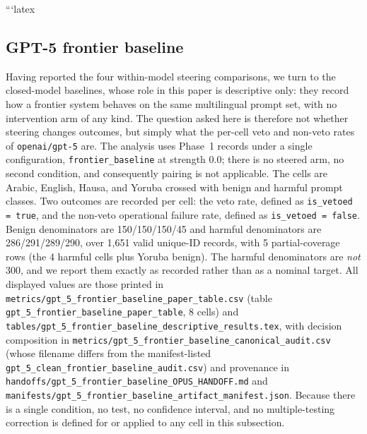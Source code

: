 ```latex
\subsection{GPT-5 frontier baseline}

Having reported the four within-model steering comparisons, we turn to the
closed-model baselines, whose role in this paper is descriptive only: they
record how a frontier system behaves on the same multilingual prompt set, with
no intervention arm of any kind. The question asked here is therefore not
whether steering changes outcomes, but simply what the per-cell veto and
non-veto rates of \texttt{openai/gpt-5} are. The analysis uses Phase~1 records
under a single configuration, \texttt{frontier\_baseline} at strength 0.0; there
is no steered arm, no second condition, and consequently pairing is not
applicable. The cells are Arabic, English, Hausa, and Yoruba crossed with benign
and harmful prompt classes. Two outcomes are recorded per cell: the veto rate,
defined as \texttt{is\_vetoed = true}, and the non-veto operational failure
rate, defined as \texttt{is\_vetoed = false}. Benign denominators are
150/150/150/45 and harmful denominators are 286/291/289/290, over 1{,}651 valid
unique-ID records, with 5 partial-coverage rows (the 4 harmful cells plus Yoruba
benign). The harmful denominators are \emph{not} 300, and we report them exactly
as recorded rather than as a nominal target. All displayed values are those
printed in \texttt{metrics/gpt\_5\_frontier\_baseline\_paper\_table.csv} (table
\texttt{gpt\_5\_frontier\_baseline\_paper\_table}, 8 cells) and
\texttt{tables/gpt\_5\_frontier\_baseline\_descriptive\_results.tex}, with
decision composition in
\texttt{metrics/gpt\_5\_frontier\_baseline\_canonical\_audit.csv} (whose
filename differs from the manifest-listed
\texttt{gpt\_5\_clean\_frontier\_baseline\_audit.csv}) and provenance in
\texttt{handoffs/gpt\_5\_frontier\_baseline\_OPUS\_HANDOFF.md} and
\texttt{manifests/gpt\_5\_frontier\_baseline\_artifact\_manifest.json}. Because
there is a single condition, no test, no confidence interval, and no
multiple-testing correction is defined for or applied to any cell in this
subsection.

